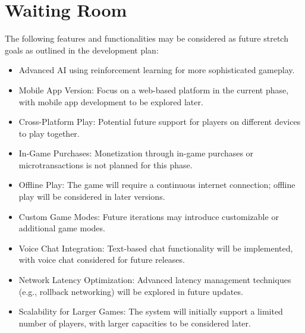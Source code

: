 \documentclass{article}
\begin{document}
\section{Waiting Room}
The following features and functionalities may be considered as future stretch goals as outlined in the development plan:
\begin{itemize}
    \item Advanced AI using reinforcement learning for more sophisticated gameplay.
    \item Mobile App Version: Focus on a web-based platform in the current phase, with mobile app development to be explored later.
    \item Cross-Platform Play: Potential future support for players on different devices to play together.
    \item In-Game Purchases: Monetization through in-game purchases or microtransactions is not planned for this phase.
    \item Offline Play: The game will require a continuous internet connection; offline play will be considered in later versions.
    \item Custom Game Modes: Future iterations may introduce customizable or additional game modes.
    \item Voice Chat Integration: Text-based chat functionality will be implemented, with voice chat considered for future releases.
    \item Network Latency Optimization: Advanced latency management techniques (e.g., rollback networking) will be explored in future updates.
    \item Scalability for Larger Games: The system will initially support a limited number of players, with larger capacities to be considered later.
\end{itemize}
\end{document}

